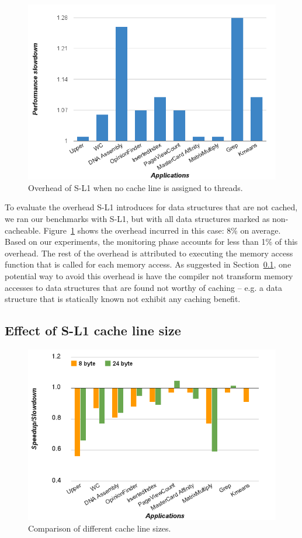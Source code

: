 \begin{figure}[t]
\includegraphics[scale=0.29]{7cachingOverhead.png}
\caption{Overhead of S-L1 when no cache line is assigned to threads.}
\label{fig:sl1overhead}
\end{figure}

To evaluate the overhead S-L1 introduces for data structures that are not cached, we ran our benchmarks with S-L1, but with all data structures marked as non-cacheable.
Figure~\ref{fig:sl1overhead} shows the overhead incurred in this case: 8\% on average.
Based on our experiments, the monitoring phase accounts for less than 1\% of this overhead. 
The rest of the overhead is attributed to executing the memory access function that is called for each memory access.
As suggested in Section~\ref{}, one potential way to avoid this overhead is have the compiler not
transform memory accesses to data structures that are found not worthy of caching -- e.g. a data
structure that is statically known not exhibit any caching benefit.


\subsection{Effect of S-L1 cache line size}


\begin{figure}[t]
\includegraphics[scale=0.29]{6differentCachelineSizes.png}
\caption{Comparison of different cache line sizes.}
\label{fig:cachelinesize}
\end{figure}

